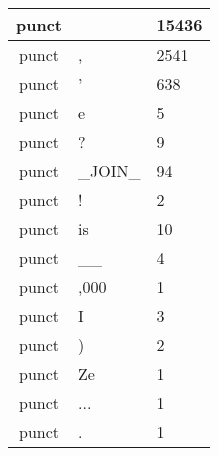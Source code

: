 \documentclass[a4 paper]{article}
\begin{document}
\begin{longtable}{cp{}p{}}
punct &  & 15436\\ \midrule punct & , & 2541\\ \midrule punct & ' & 638\\ \midrule punct & e & 5\\ \midrule punct & ? & 9\\ \midrule punct & \_JOIN\_ & 94\\ \midrule punct & ! & 2\\ \midrule punct & is & 10\\ \midrule punct & \_\_ & 4\\ \midrule punct & ,000 & 1\\ \midrule punct & I & 3\\ \midrule punct & ) & 2\\ \midrule punct & Ze & 1\\ \midrule punct & ... & 1\\ \midrule punct & . & 1\\ \midrule 

\end{longtable}
\end{document}
